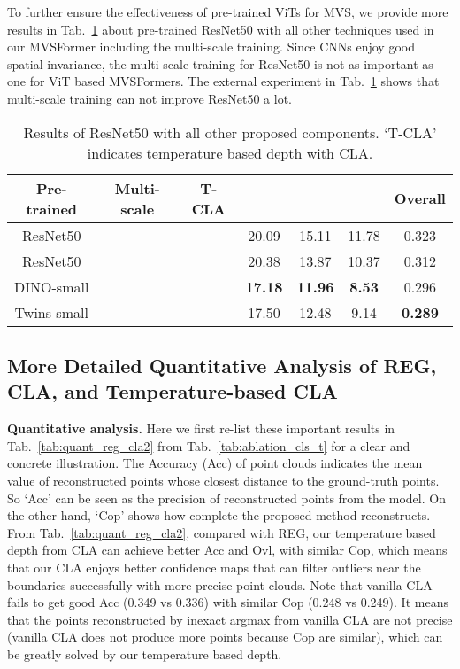 \documentclass[10pt]{article} \usepackage[preprint]{tmlr}
\begin{document}
To further ensure the effectiveness of pre-trained ViTs for MVS, we provide more results in Tab.~\ref{tab:resnet50_ablation} about pre-trained ResNet50 with all other techniques used in our MVSFormer including the multi-scale training.
Since CNNs enjoy good spatial invariance, the multi-scale training for ResNet50 is not as important as one for ViT based MVSFormers. The external experiment in Tab.~\ref{tab:resnet50_ablation} shows that multi-scale training can not improve ResNet50 a lot.

\begin{table}[h]
 \caption{Results of ResNet50 with all other proposed components. `T-CLA' indicates temperature based depth with CLA.
 \label{tab:resnet50_ablation}}
 \small
 \centering
\begin{tabular}{ccccccc}
\toprule 
Pre-trained & Multi-scale & T-CLA &  &  &  & Overall\tabularnewline
\midrule 
ResNet50 &  &  & 20.09 & 15.11 & 11.78 & 0.323\tabularnewline
ResNet50 &  &  & 20.38 & 13.87 & 10.37 & 0.312\tabularnewline
DINO-small &  &  & \textbf{17.18} & \textbf{11.96} & \textbf{8.53} & 0.296\tabularnewline
Twins-small &  &  & 17.50 & 12.48 & 9.14 & \textbf{0.289}\tabularnewline
\bottomrule
\end{tabular}
\end{table}

\subsection{More Detailed Quantitative Analysis of REG, CLA, and Temperature-based CLA}
\label{sec:appendix_analysis_of_depth}

\noindent\textbf{Quantitative analysis.}
Here we first re-list these important results in Tab.~\ref{tab:quant_reg_cla2} from Tab.~\ref{tab:ablation_cls_t} for a clear and concrete illustration.
The Accuracy (Acc) of point clouds indicates the mean value of reconstructed points whose closest distance to the ground-truth points. So ‘Acc’ can be seen as the precision of reconstructed points from the model. On the other hand, ‘Cop’ shows how complete the proposed method reconstructs. 
From Tab.~\ref{tab:quant_reg_cla2}, compared with REG, our temperature based depth from CLA can achieve better Acc and Ovl, with similar Cop, which means that our CLA enjoys better confidence maps that can filter outliers near the boundaries successfully with more precise point clouds. Note that vanilla CLA fails to get good Acc (0.349 vs 0.336) with similar Cop (0.248 vs 0.249). It means that the points reconstructed by inexact argmax from vanilla CLA are not precise (vanilla CLA does not produce more points because Cop are similar), which can be greatly solved by our temperature based depth.
\end{document}
